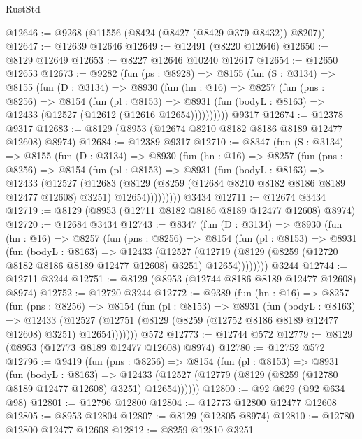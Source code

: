 \begin{lexlean}{RustStd}
\begin{coremodule}
@12646 := @9268 (@11556 (@8424 (@8427 (@8429 @379 @8432)) @8207))
@12647 := @12639 @12646
@12649 := @12491 (@8220 @12646)
@12650 := @8129 @12649
@12653 := @8227 @12646 @10240 @12617
@12654 := @12650 @12653
@12673 := @9282
    (fun (ps : @8928) =>
    @8155
      (fun (S : @3134) =>
      @8155
        (fun (D : @3134) =>
        @8930
          (fun (hn : @16) =>
          @8257
            (fun (pns : @8256) =>
            @8154
              (fun (pl : @8153) =>
              @8931 (fun (bodyL : @8163) => @12433 (@12527 (@12612 (@12616 @12654))))))))))
    @9317
@12674 := @12378 @9317
@12683 := @8129 (@8953 (@12674 @8210 @8182 @8186 @8189 @12477 @12608) @8974)
@12684 := @12389 @9317
@12710 := @8347
    (fun (S : @3134) =>
    @8155
      (fun (D : @3134) =>
      @8930
        (fun (hn : @16) =>
        @8257
          (fun (pns : @8256) =>
          @8154
            (fun (pl : @8153) =>
            @8931
              (fun (bodyL : @8163) =>
              @12433
                (@12527
                  (@12683
                    (@8129
                      (@8259 (@12684 @8210 @8182 @8186 @8189 @12477 @12608) @3251)
                      @12654)))))))))
    @3434
@12711 := @12674 @3434
@12719 := @8129 (@8953 (@12711 @8182 @8186 @8189 @12477 @12608) @8974)
@12720 := @12684 @3434
@12743 := @8347
    (fun (D : @3134) =>
    @8930
      (fun (hn : @16) =>
      @8257
        (fun (pns : @8256) =>
        @8154
          (fun (pl : @8153) =>
          @8931
            (fun (bodyL : @8163) =>
            @12433
              (@12527
                (@12719 (@8129 (@8259 (@12720 @8182 @8186 @8189 @12477 @12608) @3251) @12654))))))))
    @3244
@12744 := @12711 @3244
@12751 := @8129 (@8953 (@12744 @8186 @8189 @12477 @12608) @8974)
@12752 := @12720 @3244
@12772 := @9389
    (fun (hn : @16) =>
    @8257
      (fun (pns : @8256) =>
      @8154
        (fun (pl : @8153) =>
        @8931
          (fun (bodyL : @8163) =>
          @12433
            (@12527 (@12751 (@8129 (@8259 (@12752 @8186 @8189 @12477 @12608) @3251) @12654)))))))
    @572
@12773 := @12744 @572
@12779 := @8129 (@8953 (@12773 @8189 @12477 @12608) @8974)
@12780 := @12752 @572
@12796 := @9419
    (fun (pns : @8256) =>
    @8154
      (fun (pl : @8153) =>
      @8931
        (fun (bodyL : @8163) =>
        @12433 (@12527 (@12779 (@8129 (@8259 (@12780 @8189 @12477 @12608) @3251) @12654))))))
@12800 := @92 @629 (@92 @634 @98)
@12801 := @12796 @12800
@12804 := @12773 @12800 @12477 @12608
@12805 := @8953 @12804
@12807 := @8129 (@12805 @8974)
@12810 := @12780 @12800 @12477 @12608
@12812 := @8259 @12810 @3251

\end{coremodule}
\end{lexlean}

